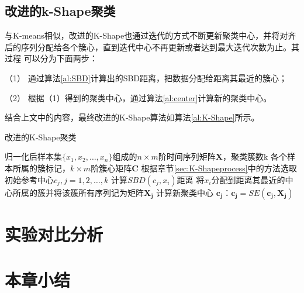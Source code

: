 \subsection{改进的k-Shape聚类}
与K-means相似，改进的K-Shape也通过迭代的方式不断更新聚类中心，并将对齐后的序列分配给各个簇心，直到迭代中心不再更新或者达到最大迭代次数为止。其过程
可以分为下面两步：

（1） 通过算法\ref{al:SBD}计算出的SBD距离，把数据分配给距离其最近的簇心；

（2） 根据（1）得到的聚类中心，通过算法\ref{al:center}计算新的聚类中心。

结合上文中的内容，最终改进的K-Shape算法如算法\ref{al:K-Shape}所示。
\begin{algorithm}[H]
    \caption{改进的K-Shape聚类}
    \begin{algorithmic}[1]
        \Require 归一化后样本集$\{x_1, x_2, \ldots, x_n\}$组成的$n \times m$阶时间序列矩阵$\mathbf{X}$，聚类簇数k
        \Ensure 各个样本所属的簇标记，$k \times m$阶簇心矩阵$\mathbf{C}$
        \State 根据章节\ref{sec:K-Shapeprocess}中的方法选取初始参考中心$c_j,j = 1, 2, \ldots, k$
                    \State 计算$SBD(c_j,x_i)$距离
                \EndFor
                \State 将$x_i$分配到距离其最近的中心所属的簇并将该簇所有序列记为矩阵$\mathbf{X_j}$
            \EndFor
                计算新聚类中心 $\mathbf{c_j}$：$\mathbf{c_j} = SE(\mathbf{c_j}, \mathbf{X_j})$
            \EndFor
        \EndWhile
    \end{algorithmic}
    \label{al:K-Shape}
\end{algorithm}
\section{实验对比分析}
\section{本章小结}
